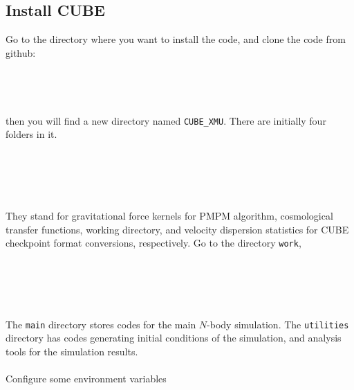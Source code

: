 \documentclass[12pt]{article}
\begin{document}
\subsection{Install CUBE}

Go to the directory where you want to install the code, and clone the code from github:
\\\\
 \\
 \\
\\
then you will find a new directory named {\tt CUBE\_XMU}. There are initially four folders in it.
\\\\
 \\
 \\
 \\
\\
They stand for gravitational force kernels for PMPM algorithm, cosmological transfer functions, working directory, and velocity dispersion statistics for CUBE checkpoint format conversions, respectively. Go to the directory {\tt work},
\\\\
 \\
 \\
 \\
\\
The {\tt main} directory stores codes for the main $N$-body simulation. The {\tt utilities} directory has codes generating initial conditions of the simulation, and analysis tools for the simulation results.
\\\\
Configure some environment variables
\\\\
\\
\\
\\
\\\\
\end{document}
